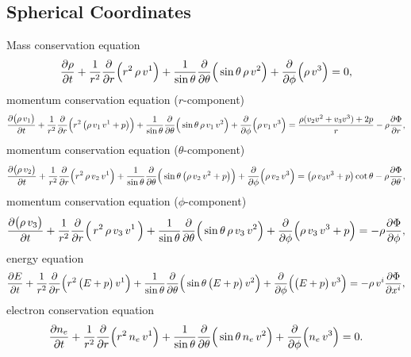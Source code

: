 \documentclass[10pt,preprint]{aastex}
\begin{document}
\subsection{Spherical Coordinates}

Mass conservation equation
\begin{equation}
  \frac{\partial \rho}{\partial t}
  +\frac{1}{r^{2}}\frac{\partial }{\partial r}\Big(r^{2}\,\rho\,v^{1}\Big)
  +\frac{1}{\sin\theta}\frac{\partial }{\partial \theta}\Big(\sin\theta\,\rho\,v^{2}\Big)
  +\frac{\partial }{\partial \phi}\Big(\rho\,v^{3}\Big)=0,
\end{equation}
momentum conservation equation ($r$-component)
\begin{equation}
  \frac{\partial \big(\rho\,v_{1}\big)}{\partial t}
  +\frac{1}{r^{2}}\frac{\partial }{\partial r}\Big(r^{2}\,\big(\rho\,v_{1}\,v^{1}+p\big)\Big)
  +\frac{1}{\sin\theta}\frac{\partial }{\partial \theta}\Big(\sin\theta\,\rho\,v_{1}\,v^{2}\Big)
  +\frac{\partial }{\partial \phi}\Big(\rho\,v_{1}\,v^{3}\Big)
  =\frac{\rho(v_{2}v^{2}+v_{3}v^{3})+2p}{r}-\rho\frac{\partial \Phi}{\partial r},
\end{equation}
momentum conservation equation ($\theta$-component)
\begin{equation}
  \frac{\partial \big(\rho\,v_{2}\big)}{\partial t}
  +\frac{1}{r^{2}}\frac{\partial }{\partial r}\Big(r^{2}\,\rho\,v_{2}\,v^{1}\Big)
  +\frac{1}{\sin\theta}\frac{\partial }{\partial \theta}\Big(\sin\theta\,\big(\rho\,v_{2}\,v^{2}+p\big)\Big)
  +\frac{\partial }{\partial \phi}\Big(\rho\,v_{2}\,v^{3}\Big)
  =\big(\rho\,v_{3}v^{3}+p\big)\cot\theta-\rho\frac{\partial \Phi}{\partial \theta},
\end{equation}
momentum conservation equation ($\phi$-component)
\begin{equation}
  \frac{\partial \big(\rho\,v_{3}\big)}{\partial t}
  +\frac{1}{r^{2}}\frac{\partial }{\partial r}\Big(\,r^{2}\,\rho\,v_{3}\,v^{1}\,\Big)
  +\frac{1}{\sin\theta}\frac{\partial }{\partial \theta}\Big(\sin\theta\,\rho\,v_{3}\,v^{2}\Big)
  +\frac{\partial }{\partial \phi}\Big(\rho\,v_{3}\,v^{3}+p\Big)
  =-\rho\frac{\partial \Phi}{\partial \phi},
\end{equation}
energy equation
\begin{equation}
  \frac{\partial E}{\partial t}
  +\frac{1}{r^{2}}\frac{\partial }{\partial r}\Big(r^{2}\,\big(E+p\big)\,v^{1}\Big)
  +\frac{1}{\sin\theta}\frac{\partial }{\partial \theta}\Big(\sin\theta\,\big(E+p\big)\,v^{2}\Big)
  +\frac{\partial }{\partial \phi}\Big(\big(E+p\big)\,v^{3}\Big)=-\rho\,v^{i}\frac{\partial \Phi}{\partial x^{i}},
\end{equation}
electron conservation equation
\begin{equation}
  \frac{\partial n_{e}}{\partial t}
  +\frac{1}{r^{2}}\frac{\partial }{\partial r}\Big(r^{2}\,n_{e}\,v^{1}\Big)
  +\frac{1}{\sin\theta}\frac{\partial }{\partial \theta}\Big(\sin\theta\,n_{e}\,v^{2}\Big)
  +\frac{\partial }{\partial \phi}\Big(n_{e}\,v^{3}\Big)=0.  
\end{equation}
\end{document}
